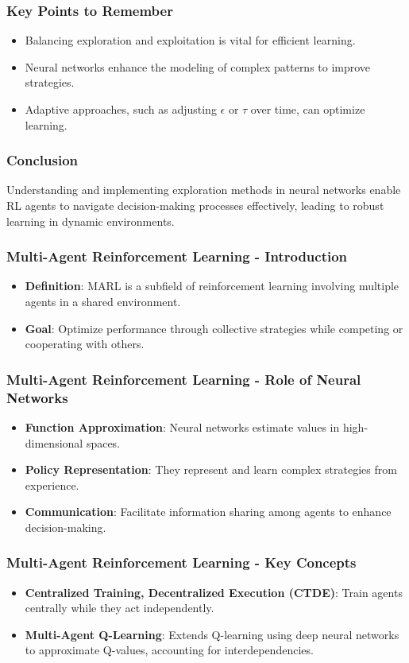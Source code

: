 \documentclass[aspectratio=169]{beamer}
\begin{document}
\begin{frame}[fragile]
    \frametitle{Key Points to Remember}
    \begin{itemize}
        \item Balancing exploration and exploitation is vital for efficient learning.
        \item Neural networks enhance the modeling of complex patterns to improve strategies.
        \item Adaptive approaches, such as adjusting \( \epsilon \) or \( \tau \) over time, can optimize learning.
    \end{itemize}
\end{frame}

\begin{frame}[fragile]
    \frametitle{Conclusion}
    Understanding and implementing exploration methods in neural networks enable RL agents to navigate decision-making processes effectively, leading to robust learning in dynamic environments.
\end{frame}

\begin{frame}[fragile]
    \frametitle{Multi-Agent Reinforcement Learning - Introduction}
    \begin{itemize}
        \item \textbf{Definition}: MARL is a subfield of reinforcement learning involving multiple agents in a shared environment.
        \item \textbf{Goal}: Optimize performance through collective strategies while competing or cooperating with others.
    \end{itemize}
\end{frame}

\begin{frame}[fragile]
    \frametitle{Multi-Agent Reinforcement Learning - Role of Neural Networks}
    \begin{itemize}
        \item \textbf{Function Approximation}: Neural networks estimate values in high-dimensional spaces.
        \item \textbf{Policy Representation}: They represent and learn complex strategies from experience.
        \item \textbf{Communication}: Facilitate information sharing among agents to enhance decision-making.
    \end{itemize}
\end{frame}

\begin{frame}[fragile]
    \frametitle{Multi-Agent Reinforcement Learning - Key Concepts}
    \begin{itemize}
        \item \textbf{Centralized Training, Decentralized Execution (CTDE)}: Train agents centrally while they act independently.
        \item \textbf{Multi-Agent Q-Learning}: Extends Q-learning using deep neural networks to approximate Q-values, accounting for interdependencies.
    \end{itemize}
\end{frame}
\end{document}
